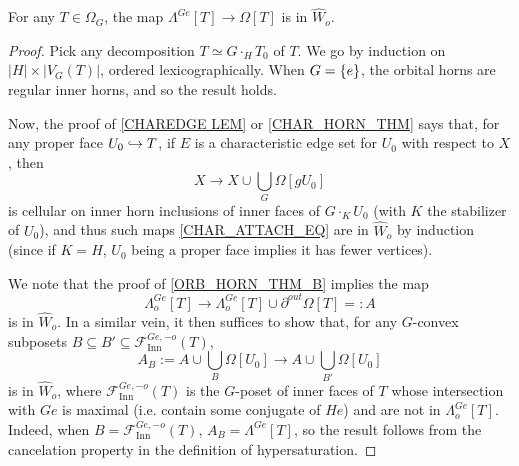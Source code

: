\documentclass[a4paper,10pt,draft]{article}%
\begin{document}
\begin{proposition}
      \label{HORN_ORB_THM}
      For any $T \in \Omega_G$, the map
      $\Lambda^{G e}[T] \to \Omega[T]$
      is in $\hat{W}_o$.
\end{proposition}
\begin{proof}
      Pick any decomposition $T \simeq G \cdot_H T_0$ of $T$.
      We go by induction on $|H| \times |V_G(T)|$, ordered lexicographically.
      When $G = \left\{e\right\}$, the orbital horns are regular inner horns, and so the result holds.

      Now, the proof of \cref{CHAREDGE LEM}
      {\color{blue} or \cref{CHAR_HORN_THM}}
      says that,
      for any proper face $U_0 \hookrightarrow T$,
      if $E$ is a characteristic edge set for $U_0$ with respect to $X$, then
      \begin{equation}
            \label{CHAR_ATTACH_EQ}
            X \to X \cup \mathop{\bigcup}\limits_G \Omega[g U_0]
      \end{equation}
      is cellular on inner horn inclusions of inner faces of $G \cdot_K U_0$ (with $K$ the stabilizer of $U_0$),
      and thus such maps \eqref{CHAR_ATTACH_EQ} are in $\hat{W}_o$ by induction
      (since if $K = H$, $U_0$ being a proper face implies it has fewer vertices).

      {\color{blue} %
        We note that the proof of \cref{ORB_HORN_THM_B} implies the map
        \begin{equation}
              \Lambda^{G e}_o[T] \to \Lambda_o^{G e}[T] \cup \partial^{out}\Omega[T] =:A
        \end{equation}
        is in $\hat{W}_o$.  
        In a similar vein,
        it then suffices to show that, for any $G$-convex subposets
        $B \subseteq B' \subseteq \mathscr{F}_{\mathrm{Inn}}^{G e,-o}(T)$,
        \begin{equation}
              \label{ORB_HORN_ATTACH_EQ}
              A_B
              := A \cup \mathop{\bigcup}\limits_{B}\Omega[U_0]
              \to
              A \cup \mathop{\bigcup}\limits_{B'}\Omega[U_0]
        \end{equation}
        is in $\hat{W}_o$,
        where $\mathscr{F}_{\mathrm{Inn}}^{G e,-o}(T)$ is
        the $G$-poset of inner faces of $T$ whose intersection with $G e$ is maximal
        (i.e. contain some conjugate of $H e$)
        and are not in $\Lambda^{G e}_o[T]$.
        Indeed, when $B = \mathscr{F}_{\mathrm{Inn}}^{G e,-o}(T)$, $A_B = \Lambda^{G e}[T]$,
        so the result follows from the cancelation property in the definition of hypersaturation.
        
}
\end{proof}
\end{document}
